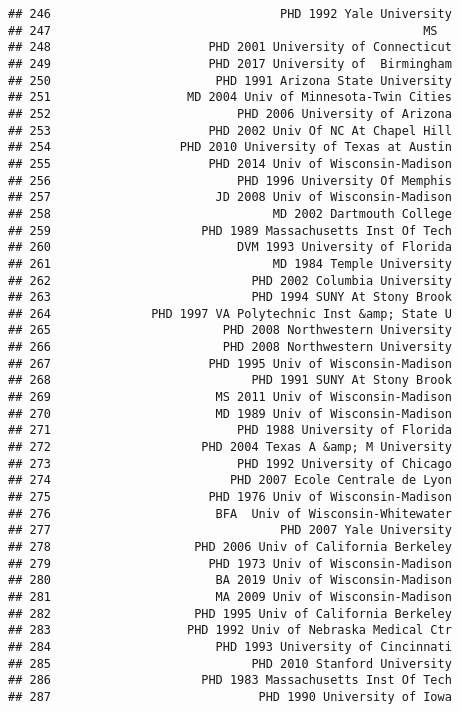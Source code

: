 \documentclass[
]{article}
\begin{document}
\begin{verbatim}
## 246                                PHD 1992 Yale University
## 247                                                    MS  
## 248                      PHD 2001 University of Connecticut
## 249                      PHD 2017 University of  Birmingham
## 250                       PHD 1991 Arizona State University
## 251                   MD 2004 Univ of Minnesota-Twin Cities
## 252                          PHD 2006 University of Arizona
## 253                      PHD 2002 Univ Of NC At Chapel Hill
## 254                  PHD 2010 University of Texas at Austin
## 255                      PHD 2014 Univ of Wisconsin-Madison
## 256                          PHD 1996 University Of Memphis
## 257                       JD 2008 Univ of Wisconsin-Madison
## 258                               MD 2002 Dartmouth College
## 259                     PHD 1989 Massachusetts Inst Of Tech
## 260                          DVM 1993 University of Florida
## 261                               MD 1984 Temple University
## 262                            PHD 2002 Columbia University
## 263                            PHD 1994 SUNY At Stony Brook
## 264              PHD 1997 VA Polytechnic Inst &amp; State U
## 265                        PHD 2008 Northwestern University
## 266                        PHD 2008 Northwestern University
## 267                      PHD 1995 Univ of Wisconsin-Madison
## 268                            PHD 1991 SUNY At Stony Brook
## 269                       MS 2011 Univ of Wisconsin-Madison
## 270                       MD 1989 Univ of Wisconsin-Madison
## 271                          PHD 1988 University of Florida
## 272                     PHD 2004 Texas A &amp; M University
## 273                          PHD 1992 University of Chicago
## 274                         PHD 2007 Ecole Centrale de Lyon
## 275                      PHD 1976 Univ of Wisconsin-Madison
## 276                       BFA  Univ of Wisconsin-Whitewater
## 277                                PHD 2007 Yale University
## 278                    PHD 2006 Univ of California Berkeley
## 279                      PHD 1973 Univ of Wisconsin-Madison
## 280                       BA 2019 Univ of Wisconsin-Madison
## 281                       MA 2009 Univ of Wisconsin-Madison
## 282                    PHD 1995 Univ of California Berkeley
## 283                   PHD 1992 Univ of Nebraska Medical Ctr
## 284                       PHD 1993 University of Cincinnati
## 285                            PHD 2010 Stanford University
## 286                     PHD 1983 Massachusetts Inst Of Tech
## 287                             PHD 1990 University of Iowa

\end{verbatim}
\end{document}
